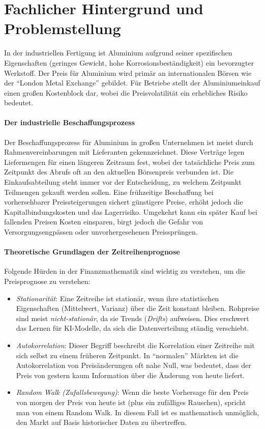 \section{Fachlicher Hintergrund und Problemstellung}
\label{sec:fachlicher_hintergrund}

In der industriellen Fertigung ist Aluminium aufgrund seiner spezifischen Eigenschaften (geringes Gewicht, hohe Korrosionsbeständigkeit) ein bevorzugter Werkstoff. Der Preis für Aluminium wird primär an internationalen Börsen wie der "`London Metal Exchange"' gebildet. Für Betriebe stellt der Aluminiumeinkauf einen großen Kostenblock dar, wobei die Preisvolatilität ein erhebliches Risiko bedeutet.

\paragraph{Der industrielle Beschaffungsprozess}
Der Beschaffungsprozess für Aluminium in großen Unternehmen ist meist durch Rahmenvereinbarungen mit Lieferanten gekennzeichnet. Diese Verträge legen Liefermengen für einen längeren Zeitraum fest, wobei der tatsächliche Preis zum Zeitpunkt des Abrufs oft an den aktuellen Börsenpreis verbunden ist. Die Einkaufsabteilung steht immer vor der Entscheidung, zu welchem Zeitpunkt Teilmengen gekauft werden sollen. Eine frühzeitige Beschaffung bei vorhersehbarer Preissteigerungen sichert günstigere Preise, erhöht jedoch die Kapitalbindungskosten und das Lagerrisiko. Umgekehrt kann ein später Kauf bei fallenden Preisen Kosten einsparen, birgt jedoch die Gefahr von Versorgungsengpässen oder unvorhergesehenen Preissprüngen.

\paragraph{Theoretische Grundlagen der Zeitreihenprognose}
Folgende Hürden in der Finanzmathematik sind wichtig zu verstehen, um die Preisprognose zu verstehen:
\begin{itemize}
    \item \emph{Stationarität}: Eine Zeitreihe ist stationär, wenn ihre statistischen Eigenschaften (Mittelwert, Varianz) über die Zeit konstant bleiben. Rohpreise sind meist \emph{nicht-stationär}, da sie Trends (\emph{Drifts}) aufweisen. Dies erschwert das Lernen für KI-Modelle, da sich die Datenverteilung ständig verschiebt.
    \item \emph{Autokorrelation}: Dieser Begriff beschreibt die Korrelation einer Zeitreihe mit sich selbst zu einem früheren Zeitpunkt. In "`normalen"' Märkten ist die Autokorrelation von Preisänderungen oft nahe Null, was bedeutet, dass der Preis von gestern kaum Information über die Änderung von heute liefert.
    \item \emph{Random Walk (Zufallsbewegung)}: Wenn die beste Vorhersage für den Preis von morgen der Preis von heute ist (plus ein zufälliges Rauschen), spricht man von einem Random Walk. In diesem Fall ist es mathematisch unmöglich, den Markt auf Basis historischer Daten zu übertreffen.
\end{itemize}

